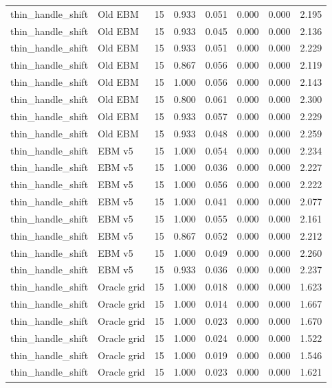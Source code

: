 {\begin{longtable}{llrrrrrr}
thin\_handle\_shift & Old EBM & 15 & 0.933 & 0.051 & 0.000 & 0.000 & 2.195 \\
thin\_handle\_shift & Old EBM & 15 & 0.933 & 0.045 & 0.000 & 0.000 & 2.136 \\
thin\_handle\_shift & Old EBM & 15 & 0.933 & 0.051 & 0.000 & 0.000 & 2.229 \\
thin\_handle\_shift & Old EBM & 15 & 0.867 & 0.056 & 0.000 & 0.000 & 2.119 \\
thin\_handle\_shift & Old EBM & 15 & 1.000 & 0.056 & 0.000 & 0.000 & 2.143 \\
thin\_handle\_shift & Old EBM & 15 & 0.800 & 0.061 & 0.000 & 0.000 & 2.300 \\
thin\_handle\_shift & Old EBM & 15 & 0.933 & 0.057 & 0.000 & 0.000 & 2.229 \\
thin\_handle\_shift & Old EBM & 15 & 0.933 & 0.048 & 0.000 & 0.000 & 2.259 \\
thin\_handle\_shift & EBM v5 & 15 & 1.000 & 0.054 & 0.000 & 0.000 & 2.234 \\
thin\_handle\_shift & EBM v5 & 15 & 1.000 & 0.036 & 0.000 & 0.000 & 2.227 \\
thin\_handle\_shift & EBM v5 & 15 & 1.000 & 0.056 & 0.000 & 0.000 & 2.222 \\
thin\_handle\_shift & EBM v5 & 15 & 1.000 & 0.041 & 0.000 & 0.000 & 2.077 \\
thin\_handle\_shift & EBM v5 & 15 & 1.000 & 0.055 & 0.000 & 0.000 & 2.161 \\
thin\_handle\_shift & EBM v5 & 15 & 0.867 & 0.052 & 0.000 & 0.000 & 2.212 \\
thin\_handle\_shift & EBM v5 & 15 & 1.000 & 0.049 & 0.000 & 0.000 & 2.260 \\
thin\_handle\_shift & EBM v5 & 15 & 0.933 & 0.036 & 0.000 & 0.000 & 2.237 \\
thin\_handle\_shift & Oracle grid & 15 & 1.000 & 0.018 & 0.000 & 0.000 & 1.623 \\
thin\_handle\_shift & Oracle grid & 15 & 1.000 & 0.014 & 0.000 & 0.000 & 1.667 \\
thin\_handle\_shift & Oracle grid & 15 & 1.000 & 0.023 & 0.000 & 0.000 & 1.670 \\
thin\_handle\_shift & Oracle grid & 15 & 1.000 & 0.024 & 0.000 & 0.000 & 1.522 \\
thin\_handle\_shift & Oracle grid & 15 & 1.000 & 0.019 & 0.000 & 0.000 & 1.546 \\
thin\_handle\_shift & Oracle grid & 15 & 1.000 & 0.023 & 0.000 & 0.000 & 1.621 \\

\end{longtable}}
